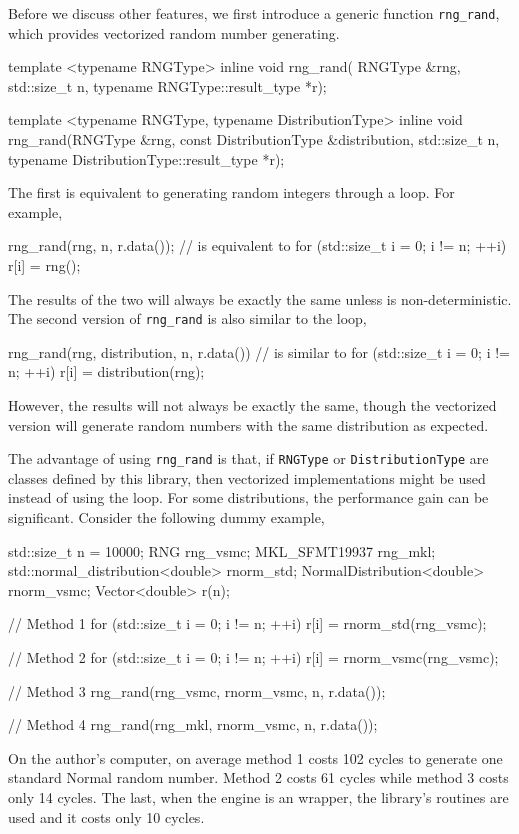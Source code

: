 Before we discuss other features, we first introduce a generic function
\verb|rng_rand|, which provides vectorized random number generating.
\begin{cppcode}
  template <typename RNGType>
  inline void rng_rand(
      RNGType &rng, std::size_t n, typename RNGType::result_type *r);

  template <typename RNGType, typename DistributionType>
  inline void rng_rand(RNGType &rng, const DistributionType &distribution,
      std::size_t n, typename DistributionType::result_type *r);
\end{cppcode}
The first is equivalent to generating random integers through a loop. For
example,
\begin{cppcode}
  rng_rand(rng, n, r.data());
  // is equivalent to
  for (std::size_t i = 0; i != n; ++i)
      r[i] = rng();
\end{cppcode}
The results of the two will always be exactly the same unless \rng{} is
non-deterministic. The second version of \verb|rng_rand| is also similar to the
loop,
\begin{cppcode}
  rng_rand(rng, distribution, n, r.data())
  // is similar to
  for (std::size_t i = 0; i != n; ++i)
      r[i] = distribution(rng);
\end{cppcode}
However, the results will not always be exactly the same, though the vectorized
version will generate random numbers with the same distribution as expected.

The advantage of using \verb|rng_rand| is that, if \verb|RNGType| or
\verb|DistributionType| are classes defined by this library, then vectorized
implementations might be used instead of using the loop. For some
distributions, the performance gain can be significant. Consider the following
dummy example,
\begin{cppcode}
  std::size_t n = 10000;
  RNG rng_vsmc;
  MKL_SFMT19937 rng_mkl;
  std::normal_distribution<double> rnorm_std;
  NormalDistribution<double> rnorm_vsmc;
  Vector<double> r(n);

  // Method 1
  for (std::size_t i = 0; i != n; ++i)
      r[i] = rnorm_std(rng_vsmc);

  // Method 2
  for (std::size_t i = 0; i != n; ++i)
      r[i] = rnorm_vsmc(rng_vsmc);

  // Method 3
  rng_rand(rng_vsmc, rnorm_vsmc, n, r.data());

  // Method 4
  rng_rand(rng_mkl, rnorm_vsmc, n, r.data());
\end{cppcode}
On the author's computer, on average method 1 costs 102 cycles to generate one
standard Normal random number. Method 2 costs 61 cycles while method 3 costs
only 14 cycles. The last, when the \rng{} engine is an \mkl{} \rng wrapper, the
\mkl library's routines are used and it costs only 10 cycles.

